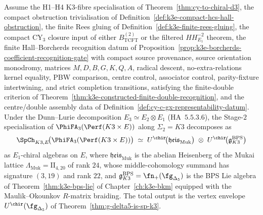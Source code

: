 \begin{corollary}
\label{cor:k3e-cy3-platonic-Sp-K3E-explicit}
Assume the H1--H4 K3-fibre specialisation of Theorem~\ref{thm:cy-to-chiral-d3}, the compact obstruction trivialisation of Definition~\ref{def:k3e-compact-hcs-hall-obstruction}, the finite Rees gluing of Definition~\ref{def:k3e-finite-rees-gluing}, the compact CY$_3$ closure input of either $B_{\mathrm{TCFT}}^{(2)}$ or the filtered $HH^{-2}_{E_1}$ theorem, the finite Hall--Borcherds recognition datum of Proposition~\ref{prop:k3e-borcherds-coefficient-recognition-gate} with compact source provenance, source orientation monodromy, matrices $M,D,B,G,K,Q,A$, radical descent, no-extra-relations kernel equality, PBW comparison, centre control, associator control, parity-fixture intertwining, and strict completion transitions, satisfying the finite-double criterion of Theorem~\ref{thm:k3e-constructed-finite-double-recognition}, and the centre/double assembly data of Definition~\ref{def:cy-c-gx-representability-datum}. Under the Dunn--Lurie decomposition $E_3 \simeq E_2 \otimes E_1$ (HA~$5.5.3.6$), the Stage-$2$ specialisation of $\PhiFA_3(\Perf(K3 \times E))$ along $\Sigma_2 = K3$ decomposes as
\begin{equation}
\label{eq:k3e-cy3-platonic-Sp-K3E}
 \SpCh_{K3, E}\!\bigl(\PhiFA_3(\Perf(K3 \times E))\bigr)
 \;\simeq\;
 U^{\chir}\!\bigl(\mathfrak{heis}_{\mathrm{Muk}}\bigr)
 \;\otimes\;
 U^{\chir}\!\bigl(\mathfrak{g}^{\mathrm{BPS}}_{K3}\bigr)
\end{equation}
as $E_1$-chiral algebras on $E$, where $\mathfrak{heis}_{\mathrm{Muk}}$ is the abelian Heisenberg of the Mukai lattice $\Lambda_{\mathrm{Muk}} = \mathrm{II}_{4, 20}$ of rank $24$, whose middle-cohomology summand has signature $(3, 19)$ and rank $22$, and $\mathfrak{g}^{\mathrm{BPS}}_{K3} = \fn_+(\fg_{\Delta_5})$ is the BPS Lie algebra of Theorem~\ref{thm:k3e-bps-lie} of Chapter~\ref{ch:k3e-bkm} equipped with the Maulik--Okounkov $R$-matrix braiding. The total output is the vertex envelope $U^{\chir}(\fg_{\Delta_5})$ of Theorem~\ref{thm:g-delta5-is-sp-k3}.
\end{corollary}

